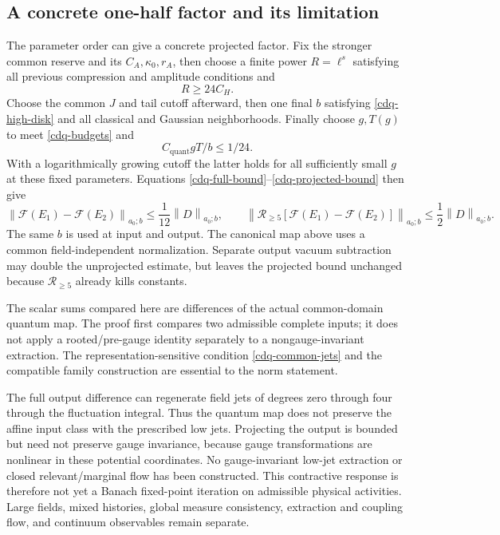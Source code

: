\documentclass[11pt]{article}
\theoremstyle{remark}
\newcommand{\norm}[1]{\left\|#1\right\|}
\begin{document}
\subsection{A concrete one-half factor and its limitation}
\label{cdq-scope-section}

The parameter order can give a concrete projected factor.
Fix the stronger common reserve and its $C_A,\kappa_0,r_A$,
then choose a finite power $R=\ell^s$ satisfying all
previous compression and amplitude conditions and
\begin{equation}
 R\ge24C_H.
 \label{cdq-R-choice}
\end{equation}
Choose the common $J$ and tail cutoff afterward, then
one final $b$ satisfying \eqref{cdq-high-disk} and all
classical and Gaussian neighborhoods. Finally choose
$g,T(g)$ to meet \eqref{cdq-budgets} and
\begin{equation}
 C_{\mathrm{quant}}gT/b\le1/24.
 \label{cdq-g-choice}
\end{equation}
With a logarithmically growing cutoff the latter holds
for all sufficiently small $g$ at these fixed parameters.
Equations \eqref{cdq-full-bound}--\eqref{cdq-projected-bound}
then give
\begin{equation}
 \norm{\mathscr F(E_1)-\mathscr F(E_2)}_{a_0;b}
       \le\frac1{12}\norm{D}_{a_0;b},\qquad
 \norm{\mathcal R_{\ge5}
       [\mathscr F(E_1)-\mathscr F(E_2)]}_{a_0;b}
       \le\frac12\norm{D}_{a_0;b}.
 \label{cdq-half-contraction}
\end{equation}
The same $b$ is used at input and output. The canonical
map above uses a common field-independent normalization.
Separate output vacuum subtraction may double the
unprojected estimate, but leaves the projected bound
unchanged because $\mathcal R_{\ge5}$ already kills
constants.

The scalar sums compared here are differences of the
actual common-domain quantum map. The proof first
compares two admissible complete inputs; it does not
apply a rooted/pre-gauge identity separately to a
nongauge-invariant extraction. The representation-sensitive
condition \eqref{cdq-common-jets} and the compatible
family construction are essential to the norm statement.

The full output difference can regenerate field jets
of degrees zero through four through the fluctuation
integral. Thus the quantum map does not preserve the
affine input class with the prescribed low jets.
Projecting the output is bounded but need not preserve
gauge invariance, because gauge transformations are
nonlinear in these potential coordinates. No
gauge-invariant low-jet extraction or closed
relevant/marginal flow has been constructed.
This contractive response is therefore not yet a
Banach fixed-point iteration on admissible physical
activities. Large fields, mixed histories, global
measure consistency, extraction and coupling flow,
and continuum observables remain separate.
\end{document}
